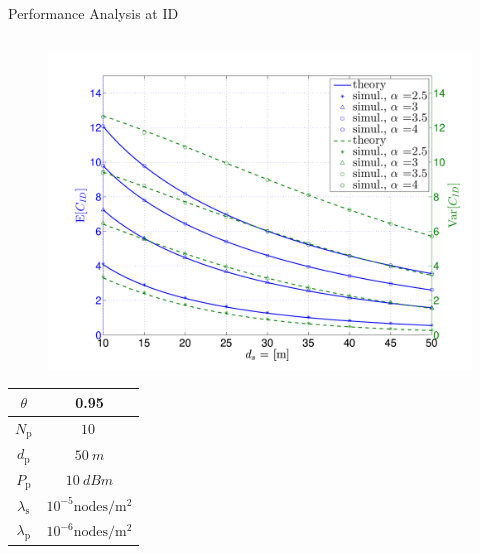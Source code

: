 \documentclass[12pt]{beamer}
\newcommand{\fs}[1]{\fontsize{ #1 pt}{8.2}\selectfont}
\newcommand{\sub}[1]{_{\text{#1}}}
\begin{document}
\begin{frame}[t]{Performance Analysis at ID}
\begin{columns}
	\begin{column}{0.45\paperwidth}
	\only<4->
	{
	\begin{overlayarea}{\textwidth}{5.1cm}
	\begin{figure}
		\centering
		\includegraphics[trim=1.0cm 0.5cm 0.7cm 1.4cm,clip=true,width= 0.42\paperwidth]{../figures/fig_ID_Cap_Moments_vs_d_s_1e5}
	\end{figure}
	\end{overlayarea}
	\begin{overlayarea}{\textwidth}{2.2cm}
	\vspace{-0.8cm}
	\fs{8}
	\begin{table}[t]
        	\renewcommand{\arraystretch}{1.3}
        \centering
        \begin{tabular}{c|c}
        \hline
        	$\theta$  & 0.95 \\ \hline
		$N\sub{p}$ & $\SI{10}{}$ \\ \hline
        	$d\sub{p}$ & $\SI{50}{m}$ \\ \hline
		$P\sub{p}$ & $\SI{10}{dBm}$ \\ \hline
		$\lambda\sub{s}$ & $10^{-5}\text{nodes}/{\text{m}^2}$  \\ \hline	
		$\lambda\sub{p}$ & $10^{-6}\text{nodes}/{\text{m}^2}$  \\ 	
\hline
        \end{tabular}
    \end{table}
    \end{overlayarea}

}
	\end{column}
\end{columns}
\end{frame}
\end{document}
